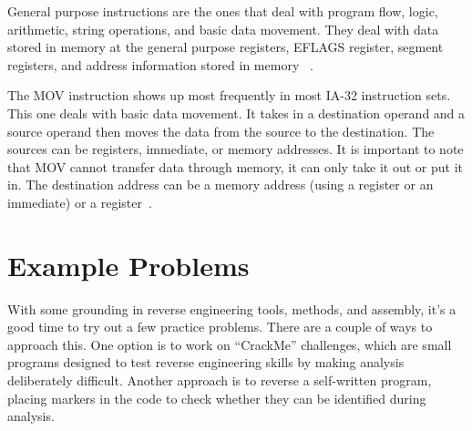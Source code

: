 General purpose instructions are the ones that deal with program flow, logic, arithmetic, string operations, and basic data movement. 
They deal with data stored in memory at the general purpose registers, EFLAGS register, segment registers, and address information stored in memory ~\cite{Reversing}.

The MOV instruction shows up most frequently in most IA-32 instruction sets. 
This one deals with basic data movement. 
It takes in a destination operand and a source operand then moves the data from the source to the destination. 
The sources can be registers, immediate, or memory addresses. 
It is important to note that MOV cannot transfer data through memory, it can only take it out or put it in. 
The destination address can be a memory address (using a register or an immediate) or a register~\cite{Reversing}.




\section{Example Problems}
With some grounding in reverse engineering tools, methods, and assembly, it's a good time to try out a few practice problems. There are a couple of ways to approach this. One option is to work on “CrackMe” challenges, which are small programs designed to test reverse engineering skills by making analysis deliberately difficult. Another approach is to reverse a self-written program, placing markers in the code to check whether they can be identified during analysis. 

